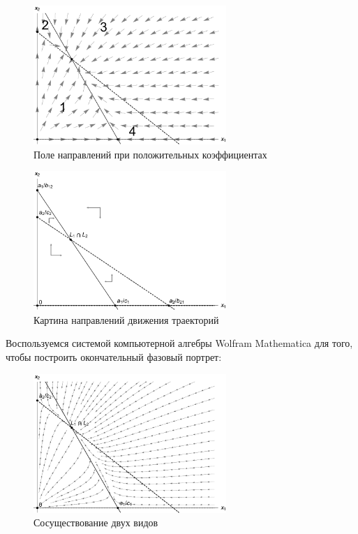 \documentclass[12pt,a4paper]{article}
\begin{document}
    
    \begin{figure}[h]
        \centering
        \includegraphics[width=0.65\textwidth]{areas_1.pdf}
        \caption{Поле направлений при положительных коэффициентах}
        \label{fig:areas_1}
    \end{figure}

    \begin{figure}[h]
        \centering
        \includegraphics[width=0.65\textwidth]{areas_1*.pdf}
        \caption{Картина направлений движения траекторий}
        \label{fig:areas_1*}
    \end{figure}

    \pagebreak

    Воспользуемся системой компьютерной алгебры Wolfram Mathematica для того, чтобы построить окончательный фазовый портрет:
    \begin{figure}[h]
        \centering
        \includegraphics[width=0.65\textwidth]{phase_1.pdf}
        \caption{Сосуществование двух видов}
        \label{fig:phase_1}
    \end{figure}
\end{document}
